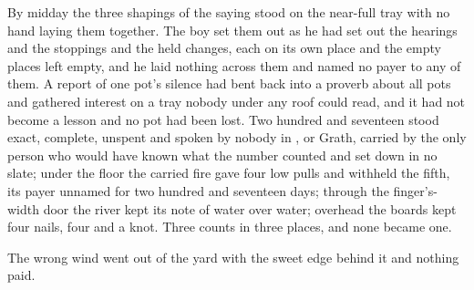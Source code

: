 \scenebreak

By midday the three shapings of the saying stood on the near-full tray with no hand laying them together. The boy set them out as he had set out the hearings and the stoppings and the held changes, each on its own place and the empty places left empty, and he laid nothing across them and named no payer to any of them. A report of one pot's silence had bent back into a proverb about all pots and gathered interest on a tray nobody under any roof could read, and it had not become a lesson and no pot had been lost. Two hundred and seventeen stood exact, complete, unspent and spoken by nobody in ,  or Grath, carried by the only person who would have known what the number counted and set down in no slate; under the floor the carried fire gave four low pulls and withheld the fifth, its payer unnamed for two hundred and seventeen days; through the finger's-width door the river kept its note of water over water; overhead the boards kept four nails, four and a knot. Three counts in three places, and none became one.

The wrong wind went out of the yard with the sweet edge behind it and nothing paid.

